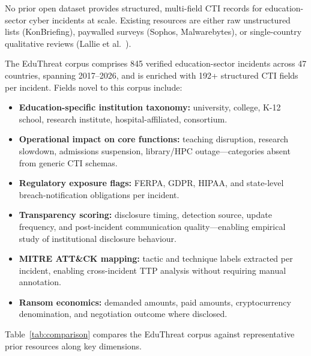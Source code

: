 \documentclass[sigconf,anonymous]{acmart}
\newcommand{\numincidents}{845\xspace}            %
\newcommand{\numcountries}{47\xspace}
\begin{document}
No prior open dataset provides structured, multi-field CTI records for education-sector cyber incidents at scale. Existing resources are either raw unstructured lists (KonBriefing), paywalled surveys (Sophos, Malwarebytes), or single-country qualitative reviews (Lallie et al.~\cite{lallie2025ukuniversities}).

The EduThreat corpus comprises \numincidents verified education-sector incidents across \numcountries countries, spanning 2017--2026, and is enriched with 192+ structured CTI fields per incident. Fields novel to this corpus include:

\begin{itemize}[leftmargin=*,nosep]
  \item \textbf{Education-specific institution taxonomy:} university, college, K-12 school, research institute, hospital-affiliated, consortium.
  \item \textbf{Operational impact on core functions:} teaching disruption, research slowdown, admissions suspension, library/HPC outage---categories absent from generic CTI schemas.
  \item \textbf{Regulatory exposure flags:} FERPA, GDPR, HIPAA, and state-level breach-notification obligations per incident.
  \item \textbf{Transparency scoring:} disclosure timing, detection source, update frequency, and post-incident communication quality---enabling empirical study of institutional disclosure behaviour.
  \item \textbf{MITRE ATT\&CK mapping:} tactic and technique labels extracted per incident, enabling cross-incident TTP analysis without requiring manual annotation.
  \item \textbf{Ransom economics:} demanded amounts, paid amounts, cryptocurrency denomination, and negotiation outcome where disclosed.
\end{itemize}

Table~\ref{tab:comparison} compares the EduThreat corpus against representative prior resources along key dimensions.
\end{document}
